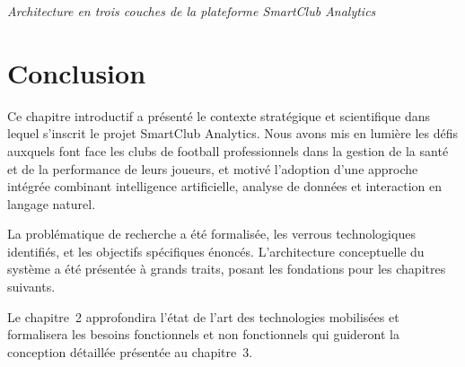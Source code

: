 \begin{center}

\vspace{0.2cm}
\small\textit{Architecture en trois couches de la plateforme SmartClub Analytics}
\end{center}

\section{Conclusion}

Ce chapitre introductif a présenté le contexte stratégique et scientifique dans lequel s'inscrit le projet SmartClub Analytics. Nous avons mis en lumière les défis auxquels font face les clubs de football professionnels dans la gestion de la santé et de la performance de leurs joueurs, et motivé l'adoption d'une approche intégrée combinant intelligence artificielle, analyse de données et interaction en langage naturel.

La problématique de recherche a été formalisée, les verrous technologiques identifiés, et les objectifs spécifiques énoncés. L'architecture conceptuelle du système a été présentée à grands traits, posant les fondations pour les chapitres suivants.

Le chapitre~2 approfondira l'état de l'art des technologies mobilisées et formalisera les besoins fonctionnels et non fonctionnels qui guideront la conception détaillée présentée au chapitre~3.
